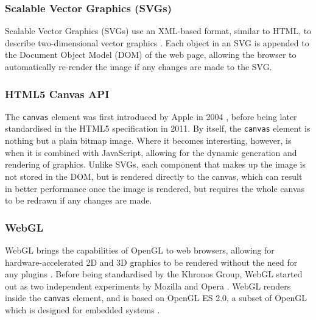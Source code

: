 \documentclass[../main.tex]{subfiles}
\begin{document}
            \subsubsection{Scalable Vector Graphics (SVGs)}
                Scalable Vector Graphics (SVGs) use an XML-based format, similar to HTML, to
                    describe two-dimensional vector graphics \citep{svg}.
                Each object in an SVG is appended to the Document Object Model (DOM) of the web
                    page, allowing the browser to automatically re-render the image if any changes
                    are made to the SVG.

            \subsubsection{HTML5 Canvas API}
                The \texttt{canvas} element was first introduced by Apple in 2004
                    \citep{appleCanvas}, before being later standardised in the HTML5 specification
                    \citep{html5Canvas} in 2011.
                By itself, the \texttt{canvas} element is nothing but a plain bitmap image.
                Where it becomes interesting, however, is when it is combined with JavaScript,
                    allowing for the dynamic generation and rendering of graphics.
                Unlike SVGs, each component that makes up the image is not stored in the DOM,
                    but is rendered directly to the canvas, which can result in better performance
                    once the image is rendered, but requires the whole canvas to be redrawn if any
                    changes are made.

            \subsubsection{WebGL}
                WebGL brings the capabilities of OpenGL to web browsers, allowing for
                    hardware-accelerated 2D and 3D graphics to be rendered without the need for any
                    plugins \citep{webGL}.
                Before being standardised by the Khronos Group, WebGL started out as two
                    independent experiments by Mozilla and Opera \citep{mozillaWebGL, operaWebGL}.
                WebGL renders inside the \texttt{canvas} element, and is based on OpenGL ES
                    2.0, a subset of OpenGL which is designed for embedded systems
                    \citep{openGLES}.
\end{document}

